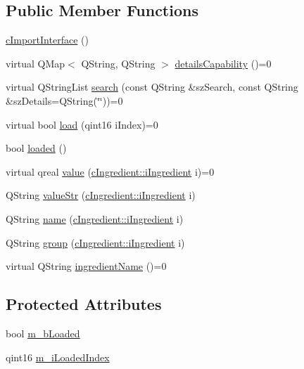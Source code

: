 \subsection*{Public Member Functions}
\begin{DoxyCompactItemize}
\item 
\hyperlink{classc_import_interface_a66f54591d75e8aa458e5afb91b3f3177}{c\+Import\+Interface} ()
\item 
virtual Q\+Map$<$ Q\+String, Q\+String $>$ \hyperlink{classc_import_interface_a4ec2f198f8488e7daf2e93cf637a580d}{details\+Capability} ()=0
\item 
virtual Q\+String\+List \hyperlink{classc_import_interface_a8b48a3821674ff15d7eaf4e03c55409f}{search} (const Q\+String \&sz\+Search, const Q\+String \&sz\+Details=Q\+String(\char`\"{}\char`\"{}))=0
\item 
virtual bool \hyperlink{classc_import_interface_a728bcb2a636f78bae2fe7e128a18e983}{load} (qint16 i\+Index)=0
\item 
bool \hyperlink{classc_import_interface_a898e0fc3651bbf855ee28756e69d48fb}{loaded} ()
\item 
virtual qreal \hyperlink{classc_import_interface_a7a8dbe6a164549272d748d2f77aebc42}{value} (\hyperlink{classc_ingredient_acf023723841ec66cd6368a25e3174a28}{c\+Ingredient\+::i\+Ingredient} i)=0
\item 
Q\+String \hyperlink{classc_import_interface_a272c43d684b605f36d36cb20e4039d94}{value\+Str} (\hyperlink{classc_ingredient_acf023723841ec66cd6368a25e3174a28}{c\+Ingredient\+::i\+Ingredient} i)
\item 
Q\+String \hyperlink{classc_import_interface_a685fafcac4d7194045e6c9e2d84d7981}{name} (\hyperlink{classc_ingredient_acf023723841ec66cd6368a25e3174a28}{c\+Ingredient\+::i\+Ingredient} i)
\item 
Q\+String \hyperlink{classc_import_interface_a1d31c90d6ef27a2b9edfb99e655120ea}{group} (\hyperlink{classc_ingredient_acf023723841ec66cd6368a25e3174a28}{c\+Ingredient\+::i\+Ingredient} i)
\item 
virtual Q\+String \hyperlink{classc_import_interface_af3f569b605787021a919816978f229bc}{ingredient\+Name} ()=0
\end{DoxyCompactItemize}
\subsection*{Protected Attributes}
\begin{DoxyCompactItemize}
\item 
bool \hyperlink{classc_import_interface_ae58ec0e6b990aa6624a12af9dc20e8dc}{m\+\_\+b\+Loaded}
\item 
qint16 \hyperlink{classc_import_interface_ab18dd3e9cf49a07f23f376362fdf317b}{m\+\_\+i\+Loaded\+Index}
\end{DoxyCompactItemize}
